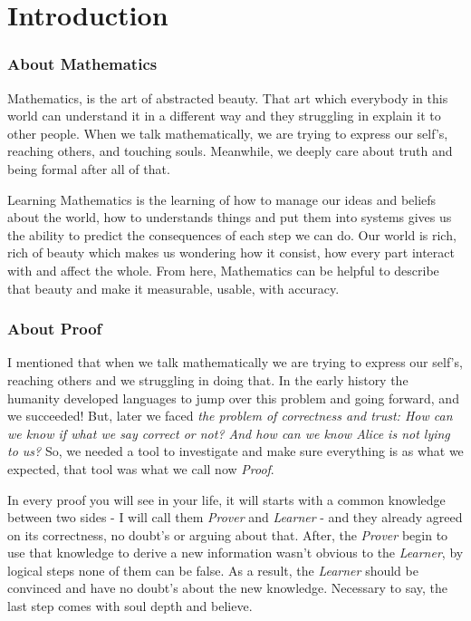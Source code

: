 \part{Introduction}
\section{About Mathematics}
Mathematics, is the art of abstracted beauty. That art which everybody in this world can understand it in a different way and they struggling in explain it to other people. When we talk mathematically, we are trying to express our self's, reaching others, and touching souls. Meanwhile, we deeply care about truth and being formal after all of that.

Learning Mathematics is the learning of how to manage our ideas and beliefs about the world, how to understands things and put them into systems gives us the ability to predict the consequences of each step we can do. Our world is rich, rich of beauty which makes us wondering how it consist, how every part interact with and affect the whole. From here, Mathematics can be helpful to describe that beauty and make it measurable, usable, with accuracy.

\section{About Proof}
I mentioned that when we talk mathematically we are trying to express our self's, reaching others and we struggling in doing that. In the early history the humanity developed languages to jump over this problem and going forward, and we succeeded! But, later we faced {\it the problem of correctness and trust: How can we know if what we say correct or not? And how can we know Alice is not lying to us?} So, we needed a tool to investigate and make sure everything is as what we expected, that tool was what we call now {\it Proof}.

In every proof you will see in your life, it will starts with a common knowledge between two sides - I will call them {\it Prover} and {\it Learner} - and they already agreed on its correctness, no doubt's or arguing about that. After, the {\it Prover} begin to use that knowledge to derive a new information wasn't obvious to the {\it Learner}, by logical steps none of them can be false. As a result, the {\it Learner} should be convinced and have no doubt's about the new knowledge. Necessary to say, the last step comes with soul depth and believe.

